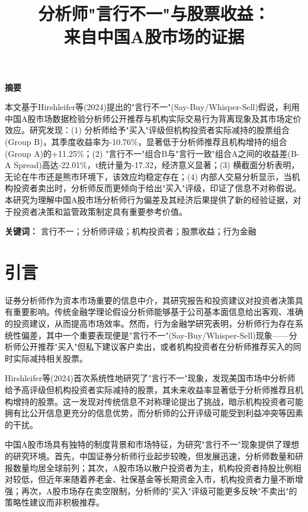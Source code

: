 \documentclass[12pt,a4paper]{article}
\title{\textbf{分析师"言行不一"与股票收益：}\\
  \textbf{来自中国A股市场的证据}}
\author{
  \normalsize
  \begin{tabular}[t]{c}
    \hline
    \hline
  \end{tabular}
}
\date{\vspace{-2em}}
\begin{document}
\maketitle

\begin{center}
\textbf{摘\quad 要}
\end{center}

本文基于Hirshleifer等(2024)提出的"言行不一"(Say-Buy/Whisper-Sell)假说，利用中国A股市场数据检验分析师公开推荐与机构实际交易行为背离现象及其市场定价效应。研究发现：(1) 分析师给予"买入"评级但机构投资者实际减持的股票组合(Group B)，其季度收益率为-10.76\%，显著低于分析师推荐且机构增持的组合(Group A)的+11.25\%；(2) "言行不一"组合B与"言行一致"组合A之间的收益差(B-A Spread)高达-22.01\%，t统计量为-17.32，经济意义显著；(3) 横截面分析表明，无论在牛市还是熊市环境下，该效应均稳定存在；(4) 内部人交易分析显示，当机构投资者卖出时，分析师反而更倾向于给出"买入"评级，印证了信息不对称假说。本研究为理解中国A股市场分析师行为偏差及其经济后果提供了新的经验证据，对于投资者决策和监管政策制定具有重要参考价值。

\vspace{2em}
\noindent\textbf{关键词：} 言行不一；分析师评级；机构投资者；股票收益；行为金融

\newpage

\section{引言}

证券分析师作为资本市场重要的信息中介，其研究报告和投资建议对投资者决策具有重要影响。传统金融学理论假设分析师能够基于公司基本面信息给出客观、准确的投资建议，从而提高市场效率。然而，行为金融学研究表明，分析师行为存在系统性偏差，其中一个重要表现便是"言行不一"(Say-Buy/Whisper-Sell)现象——分析师公开推荐"买入"但私下建议客户卖出，或者机构投资者在分析师推荐买入的同时实际减持相关股票。

Hirshleifer等(2024)首次系统性地研究了"言行不一"现象，发现美国市场中分析师给予高评级但机构投资者实际减持的股票，其未来收益率显著低于分析师推荐且机构增持的股票。这一发现对传统信息不对称理论提出了挑战，暗示机构投资者可能拥有比公开信息更充分的信息优势，而分析师的公开评级可能受到利益冲突等因素的干扰。

中国A股市场具有独特的制度背景和市场特征，为研究"言行不一"现象提供了理想的研究环境。首先，中国证券分析师行业起步较晚，但发展迅速，分析师数量和研报数量均居全球前列；其次，A股市场以散户投资者为主，机构投资者持股比例相对较低，但近年来随着养老金、社保基金等长期资金入市，机构投资者力量不断增强；再次，A股市场存在卖空限制，分析师的"买入"评级可能更多反映"不卖出"的策略性建议而非积极推荐。
\end{document}
